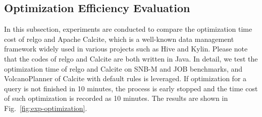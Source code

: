 

\subsection{Optimization Efficiency Evaluation}
\label{sec:experiment-optimize}

In this subsection, experiments are conducted to compare the optimization time cost of relgo and Apache Calcite, which is a well-known data management framework widely used in various projects such as Hive and Kylin.
Please note that the codes of relgo and Calcite are both written in Java.
In detail, we test the optimization time of relgo and Calcite on SNB-M and JOB benchmarks, and VolcanoPlanner of Calcite with default rules is leveraged.
If optimization for a query is not finished in 10 minutes, the process is early stopped and the time cost of such optimization is recorded as 10 minutes.
The results are shown in Fig.~\ref{fig:exp-optimization}.

